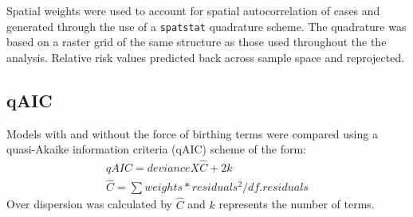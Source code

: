 \documentclass[9pt,twoside,lineno]{pnas-new}
\begin{document}
	Spatial weights were used to account for spatial autocorrelation of cases and generated through the use of a \texttt{spatstat} quadrature scheme.
The quadrature was based on a raster grid of the same structure as those used throughout the the analysis. Relative risk values predicted back across sample space and reprojected.

\subsection{qAIC}
\label{qAIC}
Models with and without the force of birthing terms were compared using a quasi-Akaike information criteria (qAIC) scheme of the form: \\
\begin{equation}
\begin{gathered}
qAIC = deviance X \hat{C} + 2k \\
\hat{C} = \sum{weights * residuals^2}/df.residuals
\end{gathered}
\end{equation}
Over dispersion was calculated by $\hat{C}$ and $k$ represents the number of terms.\\


\end{document}
